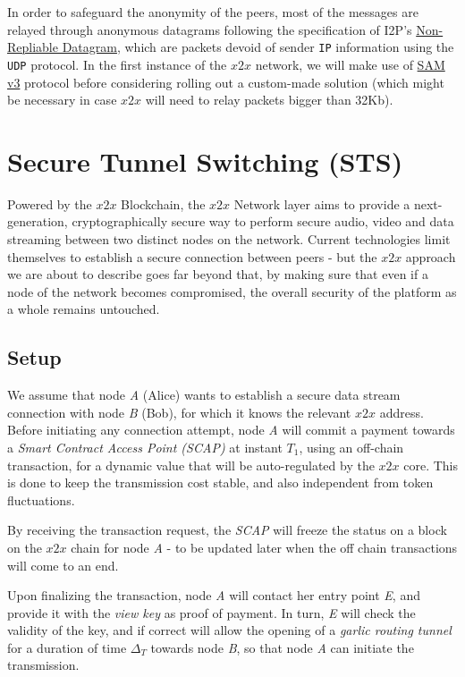 In order to safeguard the anonymity of the peers, most of the messages
are relayed through anonymous datagrams following the specification of
I2P's \href{https://geti2p.net/spec/datagrams}{Non-Repliable Datagram},
which are packets devoid of sender \texttt{IP} information using the
\texttt{UDP} protocol. In the first instance of the \(x2x\) network, we
will make use of \href{https://geti2p.net/el/docs/api/samv3}{SAM v3}
protocol before considering rolling out a custom-made solution (which
might be necessary in case \(x2x\) will need to relay packets bigger
than 32Kb).




\section{Secure Tunnel Switching (STS)}

Powered by the \(x2x\) Blockchain, the \(x2x\) Network layer aims to
provide a next-generation, cryptographically secure way to perform
secure audio, video and data streaming between two distinct nodes on the
network. Current technologies limit themselves to establish a secure
connection between peers - but the \(x2x\) approach we are about to
describe goes far beyond that, by making sure that even if a node of the
network becomes compromised, the overall security of the platform as a
whole remains untouched.

\subsection{Setup}

We assume that node \emph{A} (Alice) wants to establish a secure data
stream connection with node \emph{B} (Bob), for which it knows the
relevant \(x2x\) address. Before initiating any connection attempt, node
\emph{A} will commit a payment towards a \emph{Smart Contract Access
Point (SCAP)} at instant \(T_1\), using an off-chain transaction, for a
dynamic value that will be auto-regulated by the \(x2x\) core. This is
done to keep the transmission cost stable, and also independent from
token fluctuations.

By receiving the transaction request, the \emph{SCAP} will freeze the
status on a block on the \(x2x\) chain for node \emph{A} - to be updated
later when the off chain transactions will come to an end.

Upon finalizing the transaction, node \emph{A} will contact her entry
point \emph{E}, and provide it with the \emph{view key} as proof of
payment. In turn, \emph{E} will check the validity of the key, and if
correct will allow the opening of a \emph{garlic routing tunnel} for a
duration of time \(\Delta_T\) towards node \emph{B}, so that node
\emph{A} can initiate the transmission.

